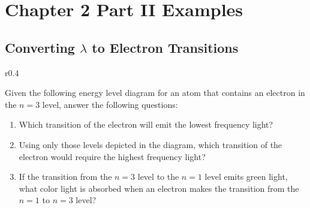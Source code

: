 \documentclass[12pt,letterpaper]{article}
\begin{document}
\section*{Chapter 2 Part II Examples}
\subsection*{Converting $\lambda$ to Electron Transitions}

\begin{wrapfigure}{r}{0.4\textwidth}
	\centering
\end{wrapfigure}


Given the following energy level diagram for an atom that contains an electron
in the $n=3$ level, answer the following questions:

\begin{enumerate}
	\item Which transition of the electron will emit the lowest frequency
		light?
	\item Using only those levels depicted in the diagram, which transition
		of the electron would require the highest frequency light?
	\item If the transition from the $n=3$ level to the $n=1$ level emits
		green light, what color light is absorbed when an electron makes
		the transition from the $n=1$ to $n=3$ level?
\end{enumerate}
\end{document}
